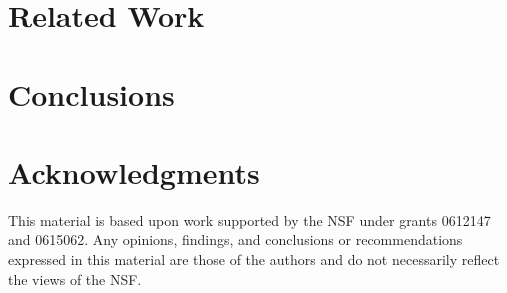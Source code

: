 \documentclass[nocopyrightspace]{sigplanconf}
\begin{document}
%

\section{Related Work}
\label{sec:related}


\section{Conclusions}
\label{sec:conclusions}


\section*{Acknowledgments}

This material is based upon work 
supported by the NSF
   under grants 0612147 and 0615062.
Any opinions, findings, and conclusions or recommendations
   expressed in this material are those of the authors and do not
   necessarily reflect the views of the NSF.



\end{document}
